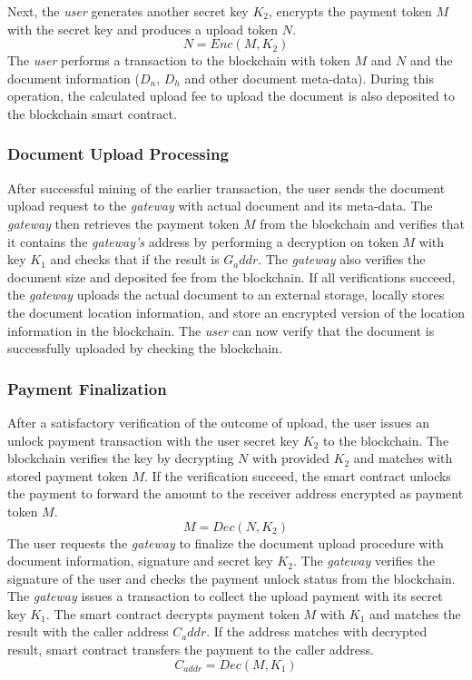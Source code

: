 \documentclass[conference]{IEEEtran}
\begin{document}
Next, the {\it user} generates another secret key $K_2$, encrypts the payment token $M$ with the secret key and produces a upload token $N$.
\begin{equation}
\label{eq-u-3}
N = Enc (M, K_2)
\end{equation}
The {\it user} performs a transaction to the blockchain with token $M$ and $N$ and the document information ($D_{n}$, $D_{h}$ and other document meta-data). During this operation, the calculated upload fee to upload the document is also deposited to the blockchain smart contract.
 
\subsubsection{Document Upload Processing}
After successful mining of the earlier transaction, the user sends the document upload request to the {\it gateway} with actual document and its meta-data. The {\it gateway} then retrieves the payment token $M$ from the blockchain and verifies that it contains the {\it gateway's} address by performing a decryption on token $M$ with key $K_1$ and checks that if the result is $G_addr$. The {\it gateway} also verifies the document size and deposited fee from the blockchain. If all verifications succeed, the {\it gateway} uploads the actual document to an external storage, locally stores the document location information, and store an encrypted version of the location information in the blockchain. The {\it user} can now verify that the document is successfully uploaded by checking the blockchain. 

\subsubsection{Payment Finalization}
After a satisfactory verification of the outcome of upload, the user issues an unlock payment transaction with the user secret key $K_2$ to the blockchain. The blockchain verifies the key by decrypting $N$ with provided $K_2$ and matches with stored payment token $M$. If the verification succeed, the smart contract unlocks the payment to forward the amount to the receiver address encrypted as payment token $M$.
\begin{equation}
\label{eq-u-5}
M = Dec (N, K_2)
\end{equation}
The user requests the {\it gateway} to finalize the document upload procedure with document information, signature and secret key $K_2$. The {\it gateway} verifies the signature of the user and checks the payment unlock status from the blockchain. The {\it gateway} issues a transaction to collect the upload payment with its secret key $K_1$. The smart contract decrypts payment token $M$ with $K_1$ and matches the result with the caller address $C_addr$. If the address matches with decrypted result, smart contract transfers the payment to the caller  address.
\begin{equation}
\label{eq-u-6}
C_{addr} = Dec (M, K_1)
\end{equation}
\end{document}
